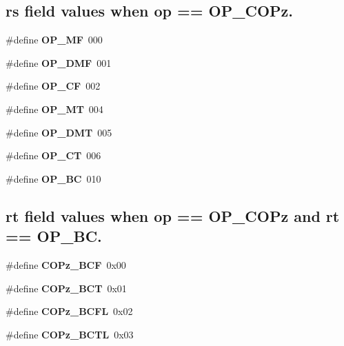 \subsection*{\textquotesingle{}rs\textquotesingle{} field values when \textquotesingle{}op\textquotesingle{} == O\+P\+\_\+\+C\+O\+Pz.}
\begin{DoxyCompactItemize}
\item 
\mbox{\label{group__mips__ops_ga5c149c4e0816a70abfc0b3666436b059}} 
\#define {\bfseries O\+P\+\_\+\+MF}~000
\item 
\mbox{\label{group__mips__ops_ga6a477f6a479188c21568379b1b2b874d}} 
\#define {\bfseries O\+P\+\_\+\+D\+MF}~001
\item 
\mbox{\label{group__mips__ops_ga63ed8f8772d929e3b6be248980360823}} 
\#define {\bfseries O\+P\+\_\+\+CF}~002
\item 
\mbox{\label{group__mips__ops_ga55dd0bddf49ffebbe8a8c5748bf53e15}} 
\#define {\bfseries O\+P\+\_\+\+MT}~004
\item 
\mbox{\label{group__mips__ops_ga88e18278cc0fc586f577d0462293cf86}} 
\#define {\bfseries O\+P\+\_\+\+D\+MT}~005
\item 
\mbox{\label{group__mips__ops_ga5ccbd29e1c033bc887944e610b6beff0}} 
\#define {\bfseries O\+P\+\_\+\+CT}~006
\item 
\mbox{\label{group__mips__ops_ga10f98afa98c96c5138ac007db815299d}} 
\#define {\bfseries O\+P\+\_\+\+BC}~010
\end{DoxyCompactItemize}
\subsection*{\textquotesingle{}rt\textquotesingle{} field values when \textquotesingle{}op\textquotesingle{} == O\+P\+\_\+\+C\+O\+Pz and \textquotesingle{}rt\textquotesingle{} == O\+P\+\_\+\+BC.}
\begin{DoxyCompactItemize}
\item 
\mbox{\label{group__mips__ops_ga5a05b315eac89e7ee588b1f3958d6bad}} 
\#define {\bfseries C\+O\+Pz\+\_\+\+B\+CF}~0x00
\item 
\mbox{\label{group__mips__ops_gaa0df0656172587f8cc8b077582dcd964}} 
\#define {\bfseries C\+O\+Pz\+\_\+\+B\+CT}~0x01
\item 
\mbox{\label{group__mips__ops_ga2bd3e20bd7cb226b03bd6de0c88fc1a8}} 
\#define {\bfseries C\+O\+Pz\+\_\+\+B\+C\+FL}~0x02
\item 
\mbox{\label{group__mips__ops_ga5de80c7967473fcfe5ec93b591746395}} 
\#define {\bfseries C\+O\+Pz\+\_\+\+B\+C\+TL}~0x03
\end{DoxyCompactItemize}
